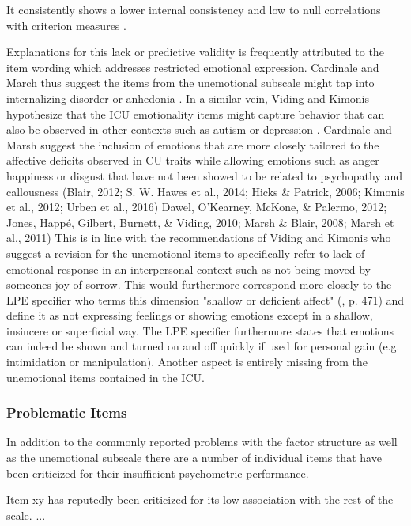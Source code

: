It consistently shows a lower internal consistency and low to null correlations with criterion measures \parencite{cardinale_reliability_2017}.

Explanations for this lack or predictive validity is frequently attributed to the item wording which addresses restricted emotional expression. 
Cardinale and March thus suggest the items from the unemotional subscale might tap into internalizing disorder or anhedonia  \parencite*{cardinale_reliability_2017}.
In a similar vein, Viding and Kimonis hypothesize that the ICU emotionality items might capture behavior that can also be observed in other contexts such as autism or depression \parencite*{viding_callousunemotional_2018}. 
Cardinale and Marsh suggest the inclusion of emotions that are more closely tailored to the affective deficits observed in CU traits while allowing emotions such as anger happiness or disgust that have not been showed to be related to psychopathy and callousness (Blair, 2012; S. W. Hawes et al., 2014; Hicks \& Patrick, 
2006; Kimonis et al., 2012; Urben et al., 2016) Dawel, O’Kearney, McKone, \& Palermo, 
2012; Jones, Happé, Gilbert, Burnett, \& Viding, 2010; 
Marsh \& Blair, 2008; Marsh et al., 2011)  
This is in line with the recommendations of Viding and Kimonis who suggest a revision for the unemotional items to specifically
refer to lack of emotional response in an interpersonal context such as not being moved by someones joy of sorrow.
This would furthermore correspond more closely to the LPE specifier who terms this dimension "shallow or deficient affect" (, p. 471)
and define it as  not expressing feelings or showing emotions except in a shallow, insincere or superficial way. 
The LPE specifier furthermore states that emotions can indeed be shown and turned on and off quickly if used for personal gain (e.g. intimidation or manipulation). 
Another aspect is entirely missing from the unemotional items contained in the ICU.


\subsubsection{Problematic Items}
In addition to the commonly reported problems with the factor structure as well as the unemotional subscale there are a number of individual items that have been criticized for their
insufficient psychometric performance.

Item xy 
has reputedly been criticized for its low association with the rest of the scale. ...


